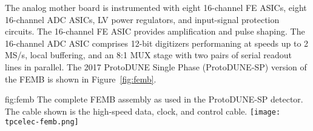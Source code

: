 The analog mother board is instrumented with eight 16-channel FE ASICs,
eight 16-channel ADC ASICs, LV power regulators, and input-signal protection circuits.
The 16-channel FE ASIC provides amplification and pulse shaping.
The 16-channel ADC ASIC comprises 12-bit digitizers performaning at speeds up to 2 MS/s, local buffering,
and an 8:1 MUX stage with two pairs of serial readout lines in parallel. The 2017 ProtoDUNE Single Phase (ProtoDUNE-SP) version of the FEMB is shown in Figure~\ref{fig:femb}.

\begin{dunefigure}
{fig:femb}
{The complete FEMB assembly as used in the ProtoDUNE-SP detector. The cable shown is the high-speed data, clock, and control cable.}
\texttt{[image: tpcelec-femb.png]}
\end{dunefigure}
